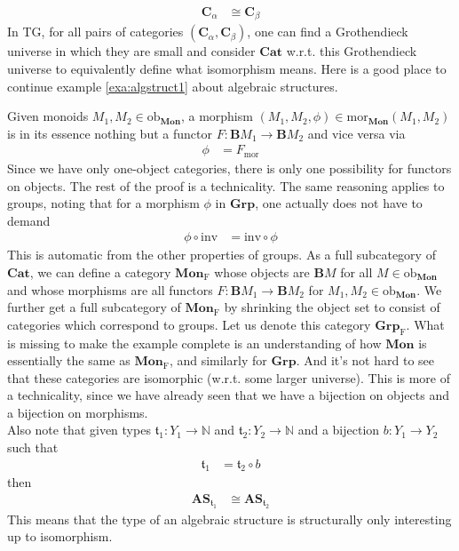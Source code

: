 \begin{align*}
  \mathbf{C}_{\alpha}
  &\cong
  \mathbf{C}_{\beta}
\end{align*}
In TG, for all pairs of categories $(\mathbf{C}_{\alpha},\mathbf{C}_{\beta})$, one can find a Grothendieck universe in which they are small and consider $\mathbf{Cat}$ w.r.t. this Grothendieck universe to equivalently define what isomorphism means.
Here is a good place to continue example \ref{exa:algstruct1} about algebraic structures.
\\
\begin{exa}
\label{exa:algstruct2}
Given monoids $M_{1},M_{2} \in \mathrm{ob}_{\mathbf{Mon}}$, a morphism $(M_{1},M_{2},\phi) \in \mathrm{mor}_{\mathbf{Mon}}(M_{1},M_{2})$ is in its essence nothing but a functor $F \colon \mathbf{B}M_{1} \rightarrow \mathbf{B}M_{2}$ and vice versa via
\begin{align*}
  \phi
  &=
  F_{\mathrm{mor}}
\end{align*}
Since we have only one-object categories, there is only one possibility for functors on objects.
The rest of the proof is a technicality.
The same reasoning applies to groups, noting that for a morphism $\phi$ in $\mathbf{Grp}$, one actually does not have to demand
\begin{align*}
  \phi
  \circ
  \mathrm{inv}
  &=
  \mathrm{inv}
  \circ
  \phi
\end{align*}
This is automatic from the other properties of groups.
As a full subcategory of $\mathbf{Cat}$, we can define a category $\mathbf{Mon}_{\mathrm{F}}$ whose objects are $\mathbf{B}M$ for all $M \in \mathrm{ob}_{\mathbf{Mon}}$ and whose morphisms are all functors $F \colon \mathbf{B}M_{1} \rightarrow \mathbf{B}M_{2}$ for $M_{1},M_{2} \in \mathrm{ob}_{\mathbf{Mon}}$.
We further get a full subcategory of $\mathbf{Mon}_{\mathrm{F}}$ by shrinking the object set to consist of categories which correspond to groups.
Let us denote this category $\mathbf{Grp}_{\mathrm{F}}$.
What is missing to make the example complete is an understanding of how $\mathbf{Mon}$ is essentially the same as $\mathbf{Mon}_{\mathrm{F}}$, and similarly for $\mathbf{Grp}$.
And it's not hard to see that these categories are isomorphic (w.r.t. some larger universe).
This is more of a technicality, since we have already seen that we have a bijection on objects and a bijection on morphisms.
\\
Also note that given types $\mathfrak{t}_{1} \colon Y_{1} \rightarrow \mathbb{N}$ and $\mathfrak{t}_{2} \colon Y_{2} \rightarrow \mathbb{N}$ and a bijection $b \colon Y_{1} \rightarrow Y_{2}$ such that
\begin{align*}
  \mathfrak{t}_{1}
  &=
  \mathfrak{t}_{2}
  \circ
  b
\end{align*}
then
\begin{align*}
  \mathbf{AS}_{\mathfrak{t}_{1}}
  &\cong
  \mathbf{AS}_{\mathfrak{t}_{2}}
\end{align*}
This means that the type of an algebraic structure is structurally only interesting up to isomorphism.
\end{exa}
